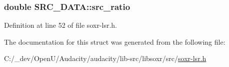 \subsubsection[{\texorpdfstring{src\+\_\+ratio}{src_ratio}}]{\setlength{\rightskip}{0pt plus 5cm}double S\+R\+C\+\_\+\+D\+A\+T\+A\+::src\+\_\+ratio}\hypertarget{struct_s_r_c___d_a_t_a_acaeb0a1991debfd736b4004f0c459530}{}\label{struct_s_r_c___d_a_t_a_acaeb0a1991debfd736b4004f0c459530}


Definition at line 52 of file soxr-\/lsr.\+h.



The documentation for this struct was generated from the following file\+:\begin{DoxyCompactItemize}
\item 
C\+:/\+\_\+dev/\+Open\+U/\+Audacity/audacity/lib-\/src/libsoxr/src/\hyperlink{soxr-lsr_8h}{soxr-\/lsr.\+h}\end{DoxyCompactItemize}
